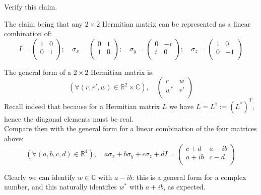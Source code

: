 \documentclass[solutions.tex]{subfiles}
\begin{document}
\maketitle
\begin{exercise} Verify this claim.
\end{exercise}
The claim being that any $2\times2$ Hermitian matrix
can be represented as a linear combination of:
\[
	I = \begin{pmatrix}
		1 & 0 \\
		0 & 1 \\
	\end{pmatrix};\quad
	\sigma_x = \begin{pmatrix}
		0 & 1 \\
		1 & 0 \\
	\end{pmatrix};\quad
	\sigma_y = \begin{pmatrix}
		0 & -i \\
		i & 0  \\
	\end{pmatrix};\quad
	\sigma_z = \begin{pmatrix}
		1 & 0 \\
		0 & -1 \\
	\end{pmatrix}
\]

The general form of a $2\times2$ Hermitian matrix is:
\[
	(\forall (r, r', w)\in\mathbb{R}^2\times\mathbb{C}),\quad
	\begin{pmatrix}
		r & w \\
		w^* & r' \\
	\end{pmatrix}
\]
Recall indeed that because for a Hermitian matrix $L$ we have
$L = L^\dagger := (L^*)^T$, hence the diagonal elements must be real. \\

Compare then with the general form for a linear combination of the four
matrices above:
\[
	(\forall (a, b, c, d)\in\mathbb{R}^4),\quad
	a\sigma_x + b\sigma_y + c\sigma_z + dI = \begin{pmatrix}
		c+d  & a-ib \\
		a+ib & c-d  \\
	\end{pmatrix}
\]

Clearly we can identify $w\in\mathbb{C}$ with $a-ib$: this is a general
form for a complex number, and this naturally identifies $w^*$ with
$a+ib$, as expected. \\
\end{document}
